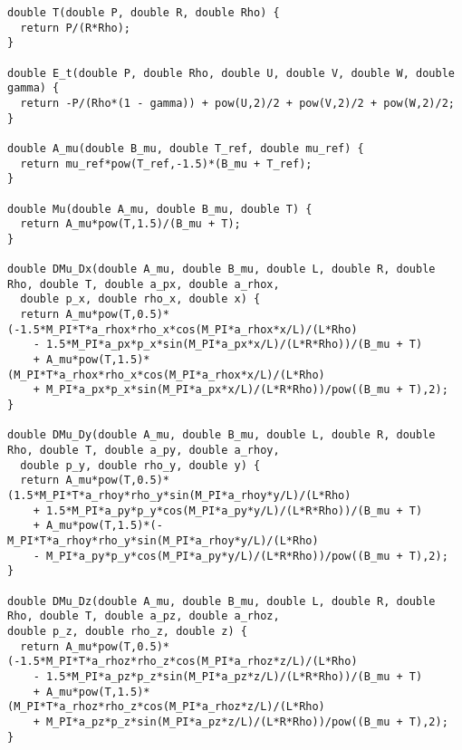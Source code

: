 \documentclass[10pt]{article}
\begin{document}
\begin{footnotesize}
\begin{verbatim}
double T(double P, double R, double Rho) {
  return P/(R*Rho);
}

double E_t(double P, double Rho, double U, double V, double W, double gamma) {
  return -P/(Rho*(1 - gamma)) + pow(U,2)/2 + pow(V,2)/2 + pow(W,2)/2;
}

double A_mu(double B_mu, double T_ref, double mu_ref) {
  return mu_ref*pow(T_ref,-1.5)*(B_mu + T_ref);
}

double Mu(double A_mu, double B_mu, double T) {
  return A_mu*pow(T,1.5)/(B_mu + T);
}

double DMu_Dx(double A_mu, double B_mu, double L, double R, double Rho, double T, double a_px, double a_rhox, 
  double p_x, double rho_x, double x) {
  return A_mu*pow(T,0.5)*(-1.5*M_PI*T*a_rhox*rho_x*cos(M_PI*a_rhox*x/L)/(L*Rho) 
	- 1.5*M_PI*a_px*p_x*sin(M_PI*a_px*x/L)/(L*R*Rho))/(B_mu + T) 
	+ A_mu*pow(T,1.5)*(M_PI*T*a_rhox*rho_x*cos(M_PI*a_rhox*x/L)/(L*Rho) 
	+ M_PI*a_px*p_x*sin(M_PI*a_px*x/L)/(L*R*Rho))/pow((B_mu + T),2);
}

double DMu_Dy(double A_mu, double B_mu, double L, double R, double Rho, double T, double a_py, double a_rhoy, 
  double p_y, double rho_y, double y) {
  return A_mu*pow(T,0.5)*(1.5*M_PI*T*a_rhoy*rho_y*sin(M_PI*a_rhoy*y/L)/(L*Rho) 
	+ 1.5*M_PI*a_py*p_y*cos(M_PI*a_py*y/L)/(L*R*Rho))/(B_mu + T) 
	+ A_mu*pow(T,1.5)*(-M_PI*T*a_rhoy*rho_y*sin(M_PI*a_rhoy*y/L)/(L*Rho) 
	- M_PI*a_py*p_y*cos(M_PI*a_py*y/L)/(L*R*Rho))/pow((B_mu + T),2);
}

double DMu_Dz(double A_mu, double B_mu, double L, double R, double Rho, double T, double a_pz, double a_rhoz, 
double p_z, double rho_z, double z) {
  return A_mu*pow(T,0.5)*(-1.5*M_PI*T*a_rhoz*rho_z*cos(M_PI*a_rhoz*z/L)/(L*Rho) 
	- 1.5*M_PI*a_pz*p_z*sin(M_PI*a_pz*z/L)/(L*R*Rho))/(B_mu + T) 
	+ A_mu*pow(T,1.5)*(M_PI*T*a_rhoz*rho_z*cos(M_PI*a_rhoz*z/L)/(L*Rho) 
	+ M_PI*a_pz*p_z*sin(M_PI*a_pz*z/L)/(L*R*Rho))/pow((B_mu + T),2);
}


\end{verbatim}
\end{footnotesize}
\end{document}
